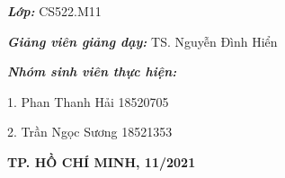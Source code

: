 \begin{titlepage}
	\vspace{1.5cm}
	\justifying \normalsize	
	\hspace{70pt} \textbf{\textit{Lớp:}} CS522.M11
		
	\hspace{70pt} \textbf{\textit{Giảng viên giảng dạy:}} TS. Nguyễn Đình Hiển
			
	\hspace{70pt} \textbf{\textit{Nhóm sinh viên thực hiện:}}
		
	\hspace{70pt} 1. \hspace{10pt} Phan Thanh Hải \hspace{98pt} 18520705
		
	\hspace{70pt} 2. \hspace{10pt} Trần Ngọc Sương \hspace{95pt} 18521353
			
	\vspace{2cm}
		
	\begin{center}
		\textbf{TP. HỒ CHÍ MINH, 11/2021}
    \end{center}

\end{titlepage}